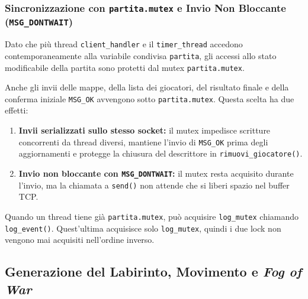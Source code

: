 \documentclass[11pt,a4paper]{article}
\begin{document}
\subsubsection{Sincronizzazione con \texttt{partita.mutex} e Invio Non Bloccante (\texttt{MSG\_DONTWAIT})}
Dato che più thread \texttt{client\_handler} e il \texttt{timer\_thread} accedono contemporaneamente alla variabile condivisa \texttt{partita}, gli accessi allo stato modificabile della partita sono protetti dal mutex \texttt{partita.mutex}.

Anche gli invii delle mappe, della lista dei giocatori, del risultato finale e della conferma iniziale \texttt{MSG\_OK} avvengono sotto \texttt{partita.mutex}. Questa scelta ha due effetti:
\begin{enumerate}
    \item \textbf{Invii serializzati sullo stesso socket:} il mutex impedisce scritture concorrenti da thread diversi, mantiene l'invio di \texttt{MSG\_OK} prima degli aggiornamenti e protegge la chiusura del descrittore in \texttt{rimuovi\_giocatore()}.
    \item \textbf{Invio non bloccante con \texttt{MSG\_DONTWAIT}:} il mutex resta acquisito durante l'invio, ma la chiamata a \texttt{send()} non attende che si liberi spazio nel buffer TCP.
\end{enumerate}

Quando un thread tiene già \texttt{partita.mutex}, può acquisire \texttt{log\_mutex} chiamando \texttt{log\_event()}. Quest'ultima acquisisce solo \texttt{log\_mutex}, quindi i due lock non vengono mai acquisiti nell'ordine inverso.

\clearpage

\subsection{Generazione del Labirinto, Movimento e \textit{Fog of War}}
\end{document}
